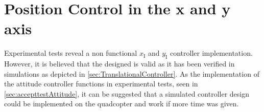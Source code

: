 \section{Position Control in the x and y axis}
%
Experimental tests reveal a non functional $x_{\mathrm{I}}$ and $y_{\mathrm{I}}$ controller implementation. However, it is believed that the designed is valid as it has been verified in simulations as depicted in \autoref{sec:TranslationalController}. As the implementation of the attitude controller functions in experimental tests, seen in \autoref{sec:accepttestAttitude}, it can be suggested that a simulated controller design could be implemented on the quadcopter and work if more time was given.


%


